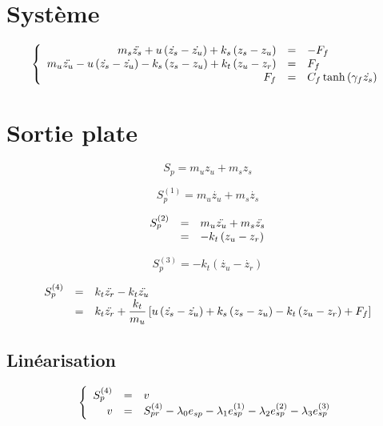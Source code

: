 \documentclass[10pt]{article}
\begin{document}
\section{Système}

\[
\left\{
\begin{array}{r c l}
  m_s \ddot{z_s} + u \left( \dot{z_s} - \dot{z_u} \right) + k_s \left( z_s - z_u \right) & = & - F_f \\
  m_u \ddot{z_u} - u \left( \dot{z_s} - \dot{z_u} \right) - k_s \left( z_s - z_u \right) + k_t \left( z_u - z_r \right) & = & F_f \\
  F_f & = & C_f \tanh\left(\gamma_f \dot{z_s} \right) \\
\end{array}
\right.
\]

\section{Sortie plate}
\[
S_p = m_u z_u + m_s z_s
\]

\[
S_p^{(1)} = m_u \dot{z_u} + m_s \dot{z_s}
\]

\[
\begin{array}{r c l}
  S_p^{(2)} &=& m_u \ddot{z_u} + m_s \ddot{z_s} \\
  &=& - k_t \left( z_u - z_r \right) \\
\end{array}
\]

\[
S_p^{(3)} = - k_t \left( \dot{z_u} - \dot{z_r} \right)
\]

\[
\begin{array}{r c l}
  S_p^{(4)} &=& k_t \ddot{z_r} - k_t \ddot{z_u} \\
  &=& k_t \ddot{z_r} + \dfrac{k_t}{m_u} \left[ u \left( \dot{z_s} - \dot{z_u} \right) + k_s \left( z_s - z_u \right) - k_t \left( z_u - z_r \right) + F_f \right] \\
\end{array}
\]

\subsection{Linéarisation}

\[
\left\{
\begin{array}{r c l}
S_p^{(4)} &=& v \\
v &=& S_{pr}^{(4)} - \lambda_0 e_{sp} - \lambda_1 e_{sp}^{(1)} - \lambda_2 e_{sp}^{(2)} - \lambda_3 e_{sp}^{(3)} \\
\end{array}
\right.
\]
\end{document}
